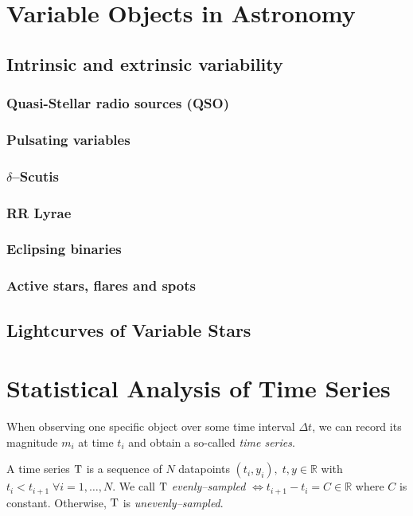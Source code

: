\section{Variable Objects in Astronomy}
\label{sec:theory-variable-objects}


\subsection{Intrinsic and extrinsic variability}
\subsubsection{Quasi-Stellar radio sources (QSO)}
\subsubsection{Pulsating variables}
\subsubsection{$\delta$--Scutis}
\subsubsection{RR Lyrae}
\subsubsection{Eclipsing binaries}
\subsubsection{Active stars, flares and spots}

\subsection{Lightcurves of Variable Stars}

\section{Statistical Analysis of Time Series}

When observing one specific object over some time interval $\Delta t$, we can record its magnitude $m_i$ at time $t_i$ and obtain a so-called \emph{time series}.

\begin{definition}
A time series $\mathrm{T}$ is a sequence of $N$ datapoints $(t_i, y_i),\; t,y \in \mathbb{R}$ with $t_i < t_{i+1} \; \forall i = 1,\ldots,N$. We call $\mathrm{T}$ \emph{evenly--sampled} $\Leftrightarrow t_{i+1} - t_i = C \in \mathbb{R}$ where $C$ is constant. Otherwise, $\mathrm{T}$ is \emph{unevenly--sampled}.
\end{definition}

